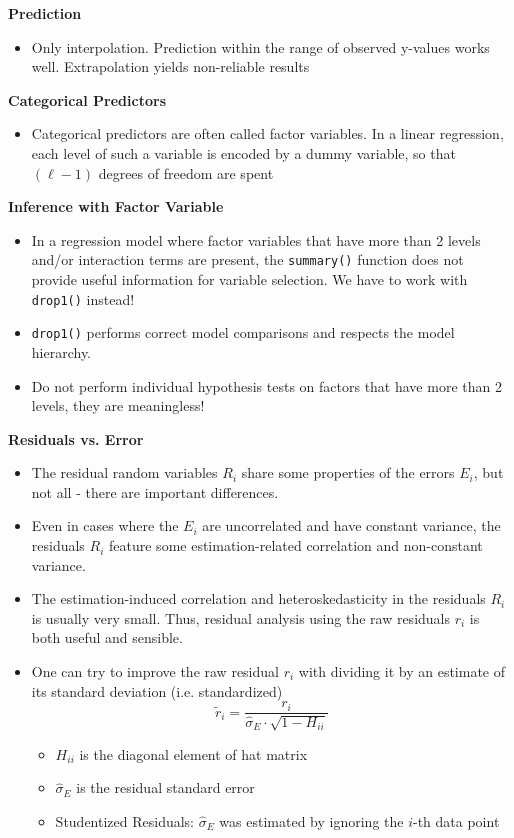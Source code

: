 \documentclass[a4paper]{article}
\begin{document}
\textbf{Prediction}
\begin{itemize}
    \item Only interpolation. Prediction within the range of observed y-values works well. Extrapolation yields non-reliable results
\end{itemize}

\textbf{Categorical Predictors}
\begin{itemize}
    \item Categorical predictors are often called factor variables. In a linear regression, each level of such a variable is encoded by a dummy variable, so that $(\ell-1)$ degrees of freedom are spent
\end{itemize}

\textbf{Inference with Factor Variable}
\begin{itemize}
    \item In a regression model where factor variables that have more than 2 levels and/or interaction terms are present, the \texttt{summary()} function does not provide useful information for variable selection. We have to work with \texttt{drop1()} instead!
    \item \texttt{drop1()} performs correct model comparisons and respects the model hierarchy.
    \item Do not perform individual hypothesis tests on factors that have more than  2 levels, they are meaningless!
\end{itemize}

\textbf{Residuals vs. Error}
\begin{itemize}
    \item The residual random variables $R_i$ share some properties of the errors $E_i$, but not all - there are important differences.
    \item Even in cases where the $E_i$ are uncorrelated and have constant variance, the residuals $R_i$ feature some estimation-related correlation and non-constant variance.
    \item The estimation-induced correlation and heteroskedasticity in the residuals $R_i$ is usually very small. Thus, residual analysis using the raw residuals $r_i$ is both useful and sensible.
    \item One can try to improve the raw residual $r_i$ with dividing it by an estimate of its standard deviation (i.e. standardized)
    \[\tilde{r}_i=\frac{r_i}{\hat{\sigma}_E\cdot\sqrt{1-H_{ii}}} \]
    \begin{itemize}
        \item $H_{ii}$ is the diagonal element of hat matrix
        \item $\hat{\sigma}_E$ is the residual standard error
        \item Studentized Residuals: $\hat{\sigma}_E$ was estimated by ignoring the $i$-th data point
    \end{itemize}
\end{itemize}
\end{document}
